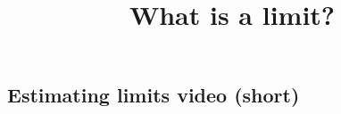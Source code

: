 \documentclass{ximera}
\title{What is a limit?}
\begin{document}
\begin{abstract}
\end{abstract}


\subsection{Estimating limits video (short)}

\begin{center}
\end{center}
\end{document}
